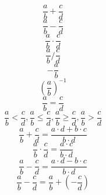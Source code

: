 \documentclass[a4paper]{article}
\begin{document}
\[ \frac{a}{b} + \frac{c}{d} \] \clearpage\[ \frac{a}{b} - \frac{c}{d} \] \clearpage\[ \frac{a}{b} \cdot \frac{c}{d} \] \clearpage\[ \frac{a}{b} / \frac{c}{d} \] \clearpage\[ -\frac{a}{b} \] \clearpage\[ \left(\frac{a}{b}\right)^{-1} \] \clearpage\[ \frac{a}{b} = \frac{c}{d} \] \clearpage\[ \frac{a}{b} < \frac{c}{d}, \frac{a}{b} \leq \frac{c}{d}, \frac{a}{b} \geq \frac{c}{d}, \frac{a}{b} > \frac{c}{d} \] \clearpage\[ \frac{a}{b} + \frac{c}{d} = \frac{a \cdot d + b \cdot c}{b \cdot d} \] \clearpage\[ \frac{a}{b} \cdot \frac{c}{d} = \frac{a \cdot c}{b \cdot d} \] \clearpage\[ \frac{a}{b} - \frac{c}{d} = \frac{a \cdot d - b \cdot c}{b \cdot d} \] \clearpage\[ \frac{a}{b} - \frac{c}{d} = \frac{a}{b} + \left(-\frac{c}{d}\right) \] \clearpage
\end{document}
